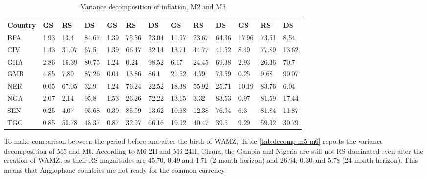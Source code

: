 \documentclass[]{article}
\begin{document}
\begin{table}[!h]

\caption{\label{tab:decomp-m2-m3}Variance decomposition of inflation, M2 and M3}
\centering
\fontsize{9}{11}\selectfont
\begin{tabu} to 
\toprule
{} &  &  &  &  \\
\cmidrule(l{3pt}r{3pt}){2-4} \cmidrule(l{3pt}r{3pt}){5-7} \cmidrule(l{3pt}r{3pt}){8-10} \cmidrule(l{3pt}r{3pt}){11-13}
\textbf{Country} & \textbf{GS} & \textbf{RS} & \textbf{DS} & \textbf{GS} & \textbf{RS} & \textbf{DS} & \textbf{GS} & \textbf{RS} & \textbf{DS} & \textbf{GS} & \textbf{RS} & \textbf{DS}\\
\hline
BFA & 1.93 & 13.4 & 84.67 & 1.39 & 75.56 & 23.04 & 11.97 & 23.67 & 64.36 & 17.96 & 73.51 & 8.54\\
CIV & 1.43 & 31.07 & 67.5 & 1.39 & 66.47 & 32.14 & 13.71 & 44.77 & 41.52 & 8.49 & 77.89 & 13.62\\
GHA & 2.86 & 16.39 & 80.75 & 1.24 & 0.24 & 98.52 & 6.17 & 24.45 & 69.38 & 2.93 & 26.36 & 70.7\\
GMB & 4.85 & 7.89 & 87.26 & 0.04 & 13.86 & 86.1 & 21.62 & 4.79 & 73.59 & 0.25 & 9.68 & 90.07\\
NER & 0.05 & 67.05 & 32.9 & 1.24 & 76.24 & 22.52 & 18.38 & 55.92 & 25.71 & 10.19 & 83.76 & 6.04\\
NGA & 2.07 & 2.14 & 95.8 & 1.53 & 26.26 & 72.22 & 13.15 & 3.32 & 83.53 & 0.97 & 81.59 & 17.44\\
SEN & 0.25 & 4.07 & 95.68 & 0.39 & 85.99 & 13.62 & 10.68 & 12.38 & 76.94 & 6.3 & 81.84 & 11.87\\
TGO & 0.85 & 50.78 & 48.37 & 0.87 & 32.97 & 66.16 & 19.92 & 40.47 & 39.6 & 9.29 & 59.92 & 30.79\\
\bottomrule
\end{tabu}
\end{table}

To make comparison between the period before and after the birth of WAMZ, Table \ref{tab:decomp-m5-m6} reports the variance decomposition of M5 and M6. According to M6-2H and M6-24H, Ghana, the Gambia and Nigeria are still not RS-dominated even after the creation of WAMZ, as their RS magnitudes are 45.70, 0.49 and 1.71 (2-month horizon) and 26.94, 0.30 and 5.78 (24-month horizon). This means that Anglophone countries are not ready for the common currency.
\end{document}
